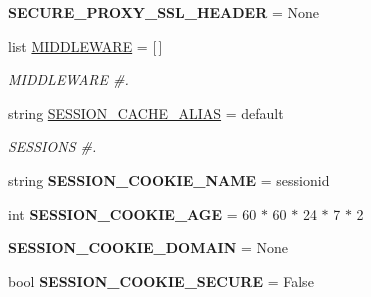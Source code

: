 \begin{DoxyCompactItemize}
{\bfseries S\+E\+C\+U\+R\+E\+\_\+\+P\+R\+O\+X\+Y\+\_\+\+S\+S\+L\+\_\+\+H\+E\+A\+D\+ER} = None
\item 
\mbox{\label{namespacedjango_1_1conf_1_1global__settings_acd17020e29aa4d806176dc81b6f0b2bd}} 
list \mbox{\hyperlink{namespacedjango_1_1conf_1_1global__settings_acd17020e29aa4d806176dc81b6f0b2bd}{M\+I\+D\+D\+L\+E\+W\+A\+RE}} = \mbox{[}$\,$\mbox{]}
\begin{DoxyCompactList}\small\item\em M\+I\+D\+D\+L\+E\+W\+A\+RE \#. \end{DoxyCompactList}\item 
\mbox{\label{namespacedjango_1_1conf_1_1global__settings_a2de8f84a3b14b66021456749d9347402}} 
string \mbox{\hyperlink{namespacedjango_1_1conf_1_1global__settings_a2de8f84a3b14b66021456749d9347402}{S\+E\+S\+S\+I\+O\+N\+\_\+\+C\+A\+C\+H\+E\+\_\+\+A\+L\+I\+AS}} = \textquotesingle{}default\textquotesingle{}
\begin{DoxyCompactList}\small\item\em S\+E\+S\+S\+I\+O\+NS \#. \end{DoxyCompactList}\item 
\mbox{\label{namespacedjango_1_1conf_1_1global__settings_a76a248ca321edd6e3eb499d435722388}} 
string {\bfseries S\+E\+S\+S\+I\+O\+N\+\_\+\+C\+O\+O\+K\+I\+E\+\_\+\+N\+A\+ME} = \textquotesingle{}sessionid\textquotesingle{}
\item 
\mbox{\label{namespacedjango_1_1conf_1_1global__settings_a0775999bcfd35b4febfe62ee3b91e2ce}} 
int {\bfseries S\+E\+S\+S\+I\+O\+N\+\_\+\+C\+O\+O\+K\+I\+E\+\_\+\+A\+GE} = 60 $\ast$ 60 $\ast$ 24 $\ast$ 7 $\ast$ 2
\item 
\mbox{\label{namespacedjango_1_1conf_1_1global__settings_aa8b5c14c4118fb2d58b2b6237ecbe641}} 
{\bfseries S\+E\+S\+S\+I\+O\+N\+\_\+\+C\+O\+O\+K\+I\+E\+\_\+\+D\+O\+M\+A\+IN} = None
\item 
\mbox{\label{namespacedjango_1_1conf_1_1global__settings_a3b0a808365cebb22666bfb6afc906776}} 
bool {\bfseries S\+E\+S\+S\+I\+O\+N\+\_\+\+C\+O\+O\+K\+I\+E\+\_\+\+S\+E\+C\+U\+RE} = False

\end{DoxyCompactItemize}
